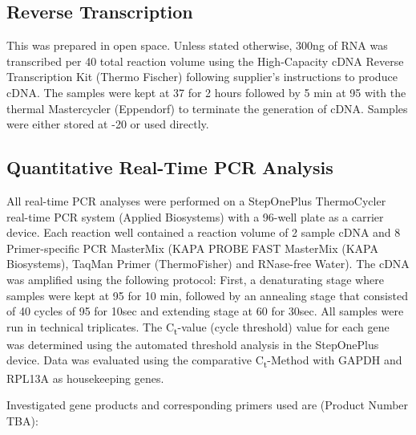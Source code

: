 \subsection{Reverse Transcription}
This was prepared in open space. Unless stated otherwise, 300ng of RNA was transcribed per 40\mul{} total reaction volume using the High-Capacity cDNA Reverse Transcription Kit (Thermo Fischer) following supplier's instructions to produce cDNA. The samples were kept at 37 \degC for 2 hours followed by 5 min at 95 \degC with the thermal Mastercycler (Eppendorf) to terminate the generation of cDNA. Samples were either stored at -20 \degC or used directly. 

\subsection{Quantitative Real-Time PCR Analysis}
All real-time PCR analyses were performed on a StepOnePlus ThermoCycler real-time PCR system (Applied Biosystems) with a 96-well plate as a carrier device. Each reaction well contained a reaction volume of 2\mul{} sample cDNA and 8\mul{} Primer-specific PCR MasterMix (KAPA PROBE FAST MasterMix (KAPA Biosystems), TaqMan\textregistered{} Primer (ThermoFisher) and RNase-free Water). The cDNA was amplified using the following protocol: First, a denaturating stage where samples were kept at 95 \degC for 10
min, followed by an annealing stage that consisted of 40 cycles of 95 \degC for 10sec and extending stage at 60 \degC for 30sec. All samples were run in technical triplicates. The C\textsubscript{t}-value (cycle threshold) value for each gene was determined using the automated threshold analysis in the StepOnePlus device. Data was evaluated using the comparative C\textsubscript{t}-Method with GAPDH and RPL13A as housekeeping genes.

Investigated gene products and corresponding primers used are (Product Number TBA): 

